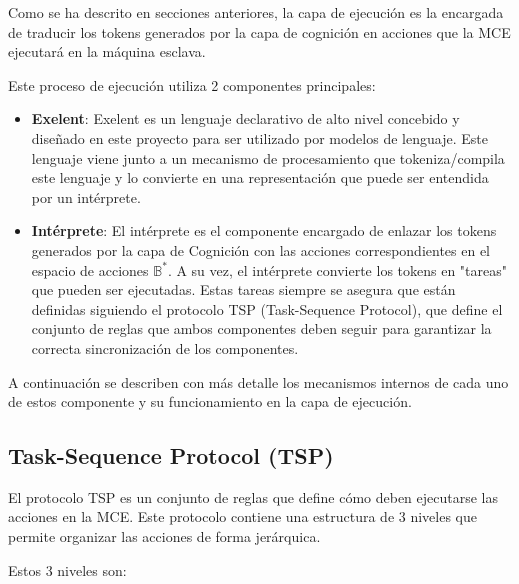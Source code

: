 Como se ha descrito en secciones anteriores, la capa de ejecución es
la encargada de traducir los tokens generados por la capa de cognición en
acciones que la MCE ejecutará en la máquina esclava. 

Este proceso de ejecución utiliza 2 componentes principales: 

\begin{itemize}

    \item \textbf{Exelent}: Exelent es un lenguaje declarativo de alto nivel 
    concebido y diseñado en este proyecto para ser utilizado por modelos de lenguaje. 
    Este lenguaje viene junto a un mecanismo de procesamiento que tokeniza/compila este 
    lenguaje y lo convierte en una representación que puede ser entendida por un intérprete.

    \item \textbf{Intérprete}: El intérprete es el componente encargado de
    enlazar los tokens generados por la capa de Cognición con las acciones
    correspondientes en el espacio de acciones \(\mathbb{B}^*\). A su vez, el
    intérprete convierte los tokens en "tareas" que pueden ser ejecutadas.
    Estas tareas siempre se asegura que están definidas siguiendo el protocolo
    TSP (Task-Sequence Protocol), que define el conjunto de reglas que ambos
    componentes deben seguir para garantizar la correcta sincronización de los 
    componentes.
    
\end{itemize}

A continuación se describen con más detalle los mecanismos internos de cada uno
de estos componente y su funcionamiento en la capa de ejecución.

\subsection{Task-Sequence Protocol (TSP)}

El protocolo TSP es un conjunto de reglas que define cómo deben ejecutarse
las acciones en la MCE. Este protocolo contiene una estructura de 3 niveles 
que permite organizar las acciones de forma jerárquica. 

Estos 3 niveles son:

